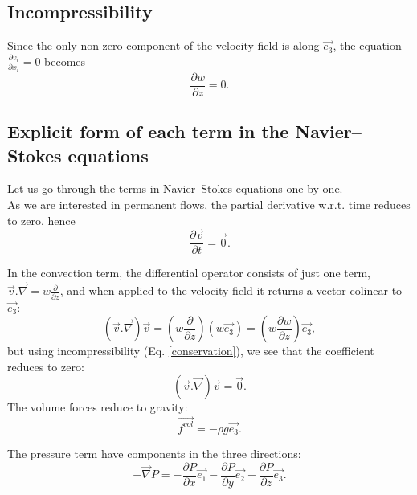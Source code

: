 \documentclass[DIV=12]{article}
\newcommand{\fVol}{\vec{f^{vol}}}
\begin{document}
\subsection{Incompressibility}

Since the only non-zero component of the velocity field is along $\vec{e_3}$, 
the equation $\frac{\partial v_i}{\partial x_i} = 0 $ becomes
 \begin{equation}
\boxed{
\frac{\partial w}{ \partial z} = 0.}
 \label{conservation}
 \end{equation}


\subsection{Explicit form of each term in the Navier--Stokes equations}
 Let us go through the terms in Navier--Stokes equations one by one.\\

 As we are interested in permanent flows, the partial derivative w.r.t. time reduces to zero, hence
 \begin{equation}
\boxed{
\frac{\partial \vec{v}}{ \partial t} =\vec{0}.}
 \label{timeDerivative}
 \end{equation}

 In the convection term, the differential operator consists of just one
 term, $\vec{v}.\vec{\nabla} = w \frac{\partial}{\partial z}$, and when
 applied to the velocity field it returns a vector colinear to $\vec{e_3}$:
 \begin{equation}
 (\vec{v}.\vec{\nabla})\vec{v} = \left(w \frac{\partial }{\partial z} \right) (w \vec{e_3}) =  \left(w \frac{\partial w}{\partial z}\right) \vec{e_3},
 \end{equation}
but using incompressibility (Eq. \ref{conservation}), we see that the coefficient reduces to zero:\\
\begin{equation}
\boxed{
 (\vec{v}.\vec{\nabla})\vec{v} = \vec{0}.}
\label{convection}
 \end{equation}
The volume forces reduce to gravity:
\begin{equation}
\fVol = -\rho g \vec{e_3}.
\label{fVol}
\end{equation}

The pressure term have components in the three directions:
\begin{equation}
\boxed{
 -\vec{\nabla} P = - \frac{\partial P}{\partial x}\vec{e_1} -  \frac{\partial P}{\partial y}\vec{e_2}-  \frac{\partial P}{\partial z}\vec{e_3}.}
 \label{pressure}
\end{equation}
\end{document}
